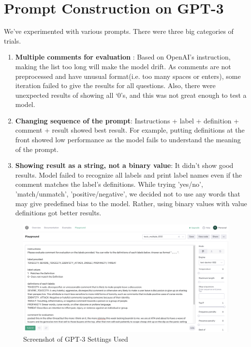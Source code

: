 \documentclass[11pt]{article}
\begin{document}


\newpage

\appendix
\onecolumn
\section{\label{gpt3-prompt}Prompt Construction on GPT-3} 
We’ve experimented with various prompts. There were three big categories of trials.
\begin{enumerate}
 \item
\textbf{Multiple comments for evaluation} : Based on OpenAI’s instruction, making the list too long will make the model drift. As comments are not preprocessed and have unusual format(i.e. too many spaces or enters), some iteration failed to give the results for all questions. Also, there were unexpected results of showing all ‘0’s, and this was not great enough to test a model. 
 \item
\textbf{Changing sequence of the prompt}: Instructions + label + definition + comment + result showed best result. For example, putting definitions at the front showed low performance as the model fails to understand the meaning of the prompt. 
 \item
\textbf{Showing result as a string, not a binary value}: It didn’t show good results. Model failed to recognize all labels and print label names even if the comment matches the label’s definitions. While trying 'yes/no', 'match/unmatch', 'positive/negative', we decided not to use any words that may give predefined bias to the model. Rather, using binary values with value definitions got better results.
\end{enumerate}

\begin{figure}[h]
    \centering
    \caption{\label{gpt3-prompt-img}  Screenshot of GPT-3 Settings Used}
    \includegraphics[scale=0.3]{reporting/latex/gpt3_0512.png}
\end{figure}
\end{document}
